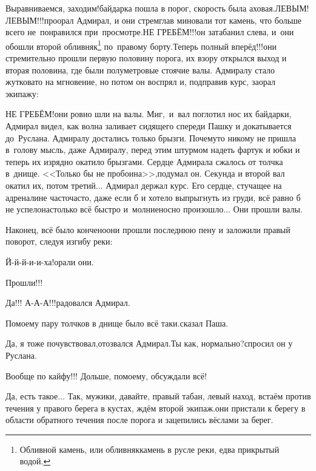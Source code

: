 \renewcommand*{\thefootnote}{\fnsymbol{footnote}}
\setcounter{footnote}{0}
\diagdash Выравниваемся, заходим!\mdash байдарка пошла в порог, скорость была аховая.\mdash ЛЕВЫМ! ЛЕВЫМ!!!\mdash проорал Адмирал, и они стремглав миновали тот камень, что больше всего не~понравился при~просмотре.\mdash НЕ ГРЕБЁМ!!!\mdash он затабанил слева, и~они обошли второй обливняк\footnote{Обливной камень, или обливняк\mdash камень в русле реки, едва прикрытый водой.} по~правому борту.\mdash Теперь полный вперёд!!!\mdash они стремительно прошли первую половину порога, их взору открылся выход и вторая половина, где были полуметровые стоячие валы. Адмиралу стало жутковато на мгновение, но потом он воспрял и, подправив курс, заорал экипажу:

\diagdash НЕ ГРЕБЁМ!\mdash они ровно шли на валы. Миг,~и~вал поглотил нос их байдарки, Адмирал видел, как волна заливает сидящего спереди Пашку и докатывается до~Руслана. Адмиралу достались только брызги. Почему\sdash то никому не пришла в~голову мысль, даже Адмиралу, перед этим штурмом надеть фартук и юбки и теперь их изрядно окатило брызгами. Сердце Адмирала сжалось от толчка в~днище. <<Только бы не пробоина>>,\mdash подумал он. Секунда и второй вал окатил их, потом третий$\ldots$ Адмирал держал курс. Его сердце, стучащее на адреналине часто\sdash часто, даже если б и хотело выпрыгнуть из груди, всё равно б не успело\mdash настолько всё быстро и~молниеносно произошло$\ldots$ Они прошли валы. 

Наконец, всё было кончено\mdash они прошли последнюю пену и заложили правый поворот, следуя изгибу реки:

\diagdash Й-й-й-и-и-ха!\mdash орали они.

\diagdash Прошли!!!

\diagdash Да!!! А-А-А!!!\mdash радовался Адмирал.

\diagdash По\sdash моему пару толчков в днище было всё таки.\mdash сказал Паша. 

\diagdash Да, я тоже почувствовал,\mdash отозвался Адмирал.\mdash Ты как, нормально?\mdash спросил он у Руслана.

\diagdash Вообще по кайфу!!! Дольше, по\sdash моему, обсуждали всё!

\diagdash Да, есть такое$\ldots$ Так, мужики, давайте, правый табан, левый наход, встаём против течения у правого берега в кустах, ждём второй экипаж.\mdash они пристали к берегу в области обратного течения после порога и зацепились вёслами за берег.

